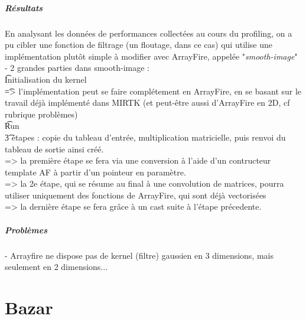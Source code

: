 \documentclass{report}
\begin{document}
\paragraph{Résultats}
En analysant les données de performances collectées au cours du profiling, on a pu cibler une fonction de filtrage (un floutage, dans ce cas) qui utilise une implémentation plutôt simple à modifier avec ArrayFire, appelée "\textit{smooth-image}"
\newline
- 2 grandes parties dans smooth-image : \\
		\t * Initialisation du kernel\\
		\t => l'implémentation peut se faire complétement en ArrayFire, en se basant sur le travail déjà implémenté dans MIRTK (et peut-être aussi d'ArrayFire en 2D, cf rubrique problèmes)\\
		\newline
			\t * Run\\
			\t 3 étapes : copie du tableau d'entrée, multiplication matricielle, puis  renvoi du tableau de sortie ainsi créé.\\
=> la première étape se fera via une conversion à l'aide d'un contructeur template AF à partir d'un pointeur en paramètre.\\
=> la 2e étape, qui se résume au final à une convolution de matrices, pourra utiliser uniquement des fonctions de ArrayFire, qui sont déjà vectorisées\\
=> la dernière étape se fera grâce à un cast suite à l'étape précedente.\\
		

\paragraph{Problèmes}
- Arrayfire ne dispose pas de kernel (filtre) gaussien en 3 dimensions, mais seulement en 2 dimensions...

\chapter*{Bazar}
\end{document}
